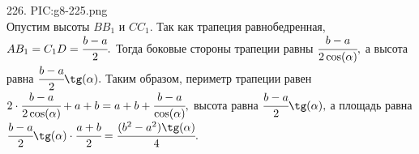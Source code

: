226. {{PIC:g8-225.png}}\\
Опустим высоты $BB_1$ и $CC_1.$ Так как трапеция равнобедренная, $AB_1=C_1D=\cfrac{b-a}{2}.$ Тогда боковые стороны трапеции равны $\cfrac{b-a}{2\cos(\alpha)},$
а высота равна $\cfrac{b-a}{2}\tg(\alpha).$ Таким образом, периметр трапеции равен $2\cdot\cfrac{b-a}{2\cos(\alpha)}+a+b=a+b+\cfrac{b-a}{\cos(\alpha)},$ высота равна $\cfrac{b-a}{2}\tg(\alpha),$ а площадь равна $\cfrac{b-a}{2}\tg(\alpha)\cdot\cfrac{a+b}{2}=\cfrac{(b^2-a^2)\tg(\alpha)}{4}.$\\
